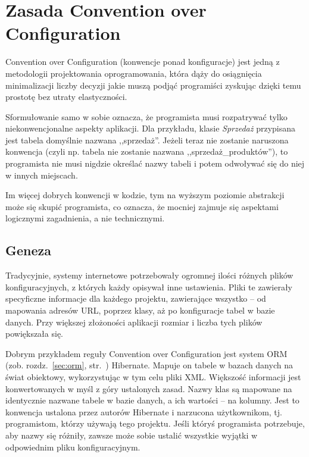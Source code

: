 \documentclass[a4paper,12pt,oneside]{report}
\begin{document}
\section{Zasada Convention over Configuration}
\label{sec:coc}
Convention over Configuration (konwencje ponad konfiguracje) jest jedną z metodologii projektowania oprogramowania, która dąży do osiągnięcia minimalizacji liczby decyzji jakie muszą podjąć programiści zyskując dzięki temu prostotę bez utraty elastyczności.

Sformułowanie samo w sobie oznacza, że programista musi rozpatrywać tylko niekonwencjonalne aspekty aplikacji. Dla przykładu, klasie \emph{Sprzedaż} przypisana jest tabela domyślnie nazwana ,,sprzedaż''. Jeżeli teraz nie zostanie naruszona konwencja (czyli np. tabela nie zostanie nazwana ,,sprzedaż\_produktów''), to programista nie musi nigdzie określać nazwy tabeli i potem odwoływać się do niej w innych miejscach.

Im więcej dobrych konwencji w kodzie, tym na wyższym poziomie abstrakcji może się skupić programista, co oznacza, że mocniej zajmuje się aspektami logicznymi zagadnienia, a nie technicznymi.

\subsection{Geneza}
\label{sub:geneza}
Tradycyjnie, systemy internetowe potrzebowały ogromnej ilości różnych plików konfiguracyjnych, z których każdy opisywał inne ustawienia. Pliki te zawierały specyficzne informacje dla każdego projektu, zawierające wszystko -- od mapowania adresów URL, poprzez klasy, aż po konfiguracje tabel w bazie danych. Przy większej złożoności aplikacji rozmiar i liczba tych plików powiększała się.

Dobrym przykładem reguły Convention over Configuration jest system ORM (zob. rozdz.~\ref{sec:orm}, str.~\pageref{sec:orm}) Hibernate. Mapuje on tabele w bazach danych na świat obiektowy, wykorzystując w tym celu pliki XML. Większość informacji jest konwertowanych w myśl z góry ustalonych zasad. Nazwy klas są mapowane na identycznie nazwane tabele w bazie danych, a ich wartości -- na kolumny. Jest to konwencja ustalona przez autorów Hibernate i narzucona użytkownikom, tj. programistom, którzy używają tego projektu. Jeśli któryś programista potrzebuje, aby nazwy się różniły, zawsze może sobie ustalić wszystkie wyjątki w odpowiednim pliku konfiguracyjnym.
\end{document}
